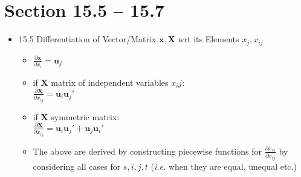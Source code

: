 \documentclass[a4paper]{article}
\newcommand{\ie}{\textit{i.e. }}
\newcommand{\mb}{\mathbf}
\begin{document}
\section*{Section 15.5 -- 15.7 }
\begin{itemize}
\item 15.5 Differentiation of Vector/Matrix $\mb{x,X}$ wrt its Elements $x_j,x_{ij}$
\begin{itemize}
\item $\frac{\partial \mathbf{x}}{\partial x_i} = \mb{u}_j$
\item if $\mb{X}$ matrix of independent variables $x_ij$:\\
$\frac{\partial \mathbf{X}}{\partial x_{ij}} = 	\mathbf{u}_i\mb{u}_j'$
\item if $\mb{X}$ symmetric matrix: \\
$\frac{\partial \mb{X}}{\partial x_{ij}} = \mb{u}_i\mb{u}_j'+\mb{u}_j	\mb{u}_i'$
\item The above are derived by constructing piecewise functions for $\frac{\partial x_{st}}{\partial x_{ij}}$ by considering all cases for $s,i,j,t$ (\ie when they are equal, unequal etc.)


\end{itemize}
\end{itemize}
\end{document}
